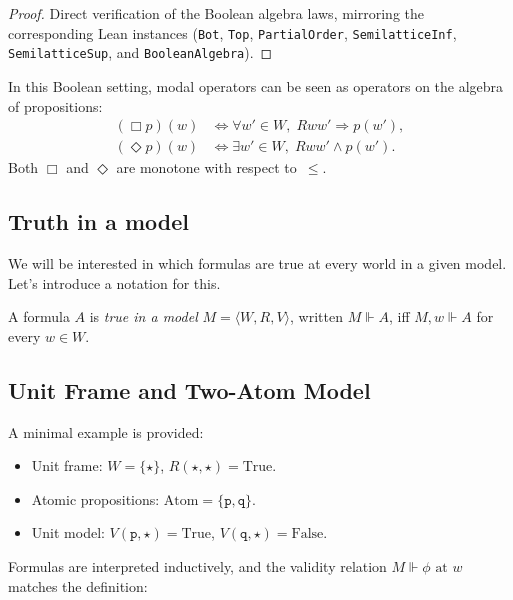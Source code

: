 \begin{proof}
    \label{proof:boolean-structure}
  \leanok
  Direct verification of the Boolean algebra laws, mirroring the
  corresponding Lean instances (\texttt{Bot}, \texttt{Top},
  \texttt{PartialOrder}, \texttt{SemilatticeInf},
  \texttt{SemilatticeSup}, and \texttt{BooleanAlgebra}).
\end{proof}

In this Boolean setting, modal operators can be seen as operators on
the algebra of propositions:
  \begin{align*}
    (\Box p)(w) &\iff \forall w' \in W,\; Rww' \Rightarrow p(w'), \\
    (\Diamond p)(w) &\iff \exists w' \in W,\; Rww' \wedge p(w').
  \end{align*}
  Both $\Box$ and $\Diamond$ are monotone with respect to~$\leq$.



\subsection{Truth in a model}

We will be interested in which formulas are true at every 
world in a given model. Let’s introduce a notation for this.

\begin{definition}
  \label{true-in-model}
  \leanok
  A formula $A$ is \emph{true in a model} 
$M = \langle W, R, V \rangle$, written $M \Vdash A$, iff 
$M, w \Vdash A$ for every $w \in W$.
\end{definition}

\subsection{Unit Frame and Two-Atom Model}

A minimal example is provided:
\begin{itemize}
  \item Unit frame: $W = \{\star\}$, $R(\star,\star) = \text{True}$.
  \item Atomic propositions: $\mathrm{Atom} = \{\texttt{p}, \texttt{q}\}$.
  \item Unit model: $V(\texttt{p},\star) = \text{True}$, $V(\texttt{q},\star) = \text{False}$.
\end{itemize}

Formulas are interpreted inductively, and the validity relation $M \Vdash \phi \text{ at } w$ matches the definition:

